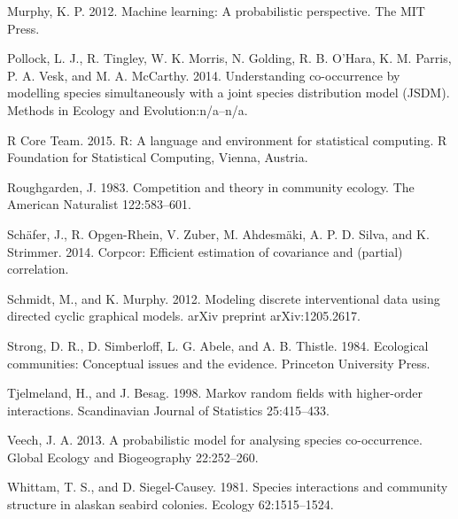 \documentclass[12pt,]{article}
\begin{document}
\begin{spacing}{1.9}
\begin{flushleft}
Murphy, K. P. 2012. Machine learning: A probabilistic perspective. The
MIT Press.

Pollock, L. J., R. Tingley, W. K. Morris, N. Golding, R. B. O'Hara, K.
M. Parris, P. A. Vesk, and M. A. McCarthy. 2014. Understanding
co-occurrence by modelling species simultaneously with a joint species
distribution model (JSDM). Methods in Ecology and Evolution:n/a--n/a.

R Core Team. 2015. R: A language and environment for statistical
computing. R Foundation for Statistical Computing, Vienna, Austria.

Roughgarden, J. 1983. Competition and theory in community ecology. The
American Naturalist 122:583--601.

Schäfer, J., R. Opgen-Rhein, V. Zuber, M. Ahdesmäki, A. P. D. Silva, and
K. Strimmer. 2014. Corpcor: Efficient estimation of covariance and
(partial) correlation.

Schmidt, M., and K. Murphy. 2012. Modeling discrete interventional data
using directed cyclic graphical models. arXiv preprint arXiv:1205.2617.

Strong, D. R., D. Simberloff, L. G. Abele, and A. B. Thistle. 1984.
Ecological communities: Conceptual issues and the evidence. Princeton
University Press.

Tjelmeland, H., and J. Besag. 1998. Markov random fields with
higher-order interactions. Scandinavian Journal of Statistics
25:415--433.

Veech, J. A. 2013. A probabilistic model for analysing species
co-occurrence. Global Ecology and Biogeography 22:252--260.

Whittam, T. S., and D. Siegel-Causey. 1981. Species interactions and
community structure in alaskan seabird colonies. Ecology 62:1515--1524.


\end{flushleft}
\end{spacing}
\end{document}

